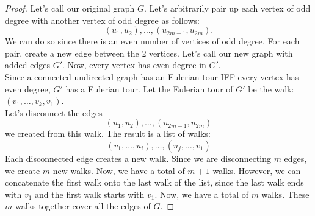 \documentclass[11pt]{article}
\begin{document}
\begin{solution}
\begin{Parts}
\Part \begin{proof}
Let's call our original graph $G$.
Let's arbitrarily pair up each vertex of odd degree with another vertex of odd degree as follows:
$$(u_1,u_2),\dots,(u_{2m-1},u_{2m}).$$
We can do so since there is an even number of vertices of odd degree.
For each pair, create a new edge between the 2 vertices. 
Let's call our new graph with added edges $G'$.
Now, every vertex has even degree in $G'$. 
\\Since a connected undirected graph has an Eulerian tour IFF every vertex has even degree, $G'$ has a Eulerian tour.
Let the Eulerian tour of $G'$ be the walk:
$(v_1,\dots,v_k,v_1)$.
\\Let's disconnect the edges
$$(u_1,u_2),\dots,(u_{2m-1},u_{2m})$$
we created from this walk.
The result is a list of walks:
$$(v_1,\dots,u_i),\dots,(u_j,\dots,v_1)$$
Each disconnected edge creates a new walk.
Since we are disconnecting $m$ edges, we create $m$ new walks.
Now, we have a total of $m+1$ walks.
However, we can concatenate the first walk onto the last walk of the list, since the last walk ends with $v_1$ and the first walk starts with $v_1$.
Now, we have a total of $m$ walks.
These $m$ walks together cover all the edges of $G$.
\end{proof}


\end{Parts}
\end{solution}
\end{document}
